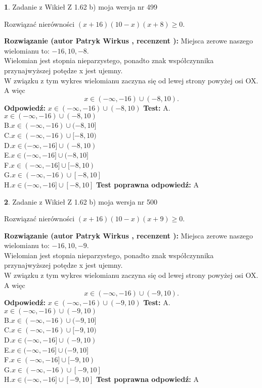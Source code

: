 \documentclass[12pt, a4paper]{article}
\theoremstyle{definition} %
\newtheorem{zad}{}
\newcommand{\zadStart}[1]{\begin{zad}#1\newline}
\newcommand{\zadStop}{\end{zad}}
\newcommand{\rozwStart}[2]{\noindent \textbf{Rozwiązanie (autor #1 , recenzent #2): }\newline}
\newcommand{\rozwStop}{\newline}
\newcommand{\odpStart}{\noindent \textbf{Odpowiedź:}\newline}
\newcommand{\odpStop}{\newline}
\newcommand{\testStart}{\noindent \textbf{Test:}\newline}
\newcommand{\testStop}{\newline}
\newcommand{\kluczStart}{\noindent \textbf{Test poprawna odpowiedź:}\newline}
\newcommand{\kluczStop}{\newline}
\begin{document}
\zadStart{Zadanie z Wikieł Z 1.62 b) moja wersja nr 499}

Rozwiązać nierówności $(x+16)(10-x)(x+8)\ge0$.
\zadStop
\rozwStart{Patryk Wirkus}{}
Miejsca zerowe naszego wielomianu to: $-16, 10, -8$.\\
Wielomian jest stopnia nieparzystego, ponadto znak współczynnika przy\linebreak najwyższej potędze x jest ujemny.\\ W związku z tym wykres wielomianu zaczyna się od lewej strony powyżej osi OX. A więc $$x \in (-\infty,-16) \cup (-8,10).$$
\rozwStop
\odpStart
$x \in (-\infty,-16) \cup (-8,10)$
\odpStop
\testStart
A.$x \in (-\infty,-16) \cup (-8,10)$\\
B.$x \in (-\infty,-16) \cup (-8,10]$\\
C.$x \in (-\infty,-16) \cup [-8,10)$\\
D.$x \in (-\infty,-16] \cup (-8,10)$\\
E.$x \in (-\infty,-16] \cup (-8,10]$\\
F.$x \in (-\infty,-16] \cup [-8,10)$\\
G.$x \in (-\infty,-16) \cup [-8,10]$\\
H.$x \in (-\infty,-16] \cup [-8,10]$
\testStop
\kluczStart
A
\kluczStop



\zadStart{Zadanie z Wikieł Z 1.62 b) moja wersja nr 500}

Rozwiązać nierówności $(x+16)(10-x)(x+9)\ge0$.
\zadStop
\rozwStart{Patryk Wirkus}{}
Miejsca zerowe naszego wielomianu to: $-16, 10, -9$.\\
Wielomian jest stopnia nieparzystego, ponadto znak współczynnika przy\linebreak najwyższej potędze x jest ujemny.\\ W związku z tym wykres wielomianu zaczyna się od lewej strony powyżej osi OX. A więc $$x \in (-\infty,-16) \cup (-9,10).$$
\rozwStop
\odpStart
$x \in (-\infty,-16) \cup (-9,10)$
\odpStop
\testStart
A.$x \in (-\infty,-16) \cup (-9,10)$\\
B.$x \in (-\infty,-16) \cup (-9,10]$\\
C.$x \in (-\infty,-16) \cup [-9,10)$\\
D.$x \in (-\infty,-16] \cup (-9,10)$\\
E.$x \in (-\infty,-16] \cup (-9,10]$\\
F.$x \in (-\infty,-16] \cup [-9,10)$\\
G.$x \in (-\infty,-16) \cup [-9,10]$\\
H.$x \in (-\infty,-16] \cup [-9,10]$
\testStop
\kluczStart
A
\kluczStop
\end{document}
